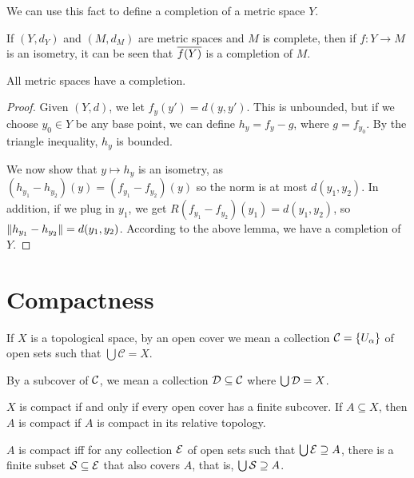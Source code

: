 We can use this fact to define a completion of a metric space $Y$.

\begin{lemma}
    If $(Y, d_Y)$ and $(M, d_M)$ are metric spaces and $M$ is complete, then if $f \colon Y \to M$ is an isometry, it can be seen that $\overline{f(Y)}$ is a completion of $M$.
\end{lemma}

\begin{theorem}
    All metric spaces have a completion.
\end{theorem}

\begin{proof}
    Given $(Y, d)$, we let $f_y(y') = d(y, y')$. This is unbounded, but if we choose $y_0 \in Y$ be any base point, we can define $h_y = f_y - g$, where $g = f_{y_0}$. By the triangle inequality, $h_y$ is bounded.

    We now show that $y \mapsto h_y$ is an isometry, as $(h_{y_1} - h_{y_2})(y) = (f_{y_1} - f_{y_2})(y)$ so the norm is at most $d(y_1, y_2)$. In addition, if we plug in $y_1$, we get $R(f_{y_1} - f_{y_2})(y_1) = d(y_1, y_2)$, so $\norm{h_{y_1} - h_{y_2}} = d(y_1, y_2)$. According to the above lemma, we have a completion of $Y$.
\end{proof}

\section{Compactness}

\begin{definition}
    If $X$ is a topological space, by an open cover we mean a collection $\mathcal C = \qty{U_\alpha}$ of open sets such that $\bigcup \mathcal C = X$.

    By a subcover of $\mathcal C$, we mean a collection $\mathcal D \subseteq \mathcal C$ where $\bigcup \mathcal D = X$.
\end{definition}

\begin{definition}[Compactness]
    $X$ is compact if and only if every open cover has a finite subcover. If $A \subseteq X$, then $A$ is compact if $A$ is compact in its relative topology.
\end{definition}

\begin{proposition}
    $A$ is compact iff for any collection $\mathcal E$ of open sets such that $\bigcup \mathcal E \supseteq A$, there is a finite subset $\mathcal S \subseteq \mathcal E$ that also covers $A$, that is, $\bigcup \mathcal S \supseteq A$. 
\end{proposition}

